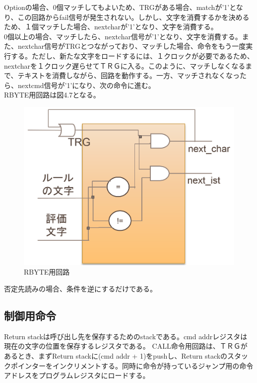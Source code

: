 \documentclass[12pt,oneside]{report}
\begin{document}
Optionの場合、0個マッチしてもよいため、TRGがある場合、matchが'1'となり、この回路からfail信号が発生されない。しかし、文字を消費するかを決めるため、１個マッチした場合、nextcharが'1'となり、文字を消費する。\\

0個以上の場合、マッチしたら、nextchar信号が'1'となり、文字を消費する。また、nextchar信号がTRGとつながっており、マッチした場合、命令をもう一度実行する。ただし、新たな文字をロードするには、１クロックが必要であるため、nextcharを１クロック遅らせてＴＲＧに入る。このように、マッチしなくなるまで、テキストを消費しながら、回路を動作する。一方、マッチされなくなったら、nextcmd信号が'1'になり、次の命令に進む。\\
RBYTE用回路は図4.7となる。

\begin{figure}[t]
    \begin{center}
        \includegraphics[width=130mm]{./fig/rbyte.png}
       \caption{RBYTE用回路}
        \label{fig:rbyte}
    \end{center}
\end{figure}

否定先読みの場合、条件を逆にするだけである。


\subsection{制御用命令}
Return stackは呼び出し先を保存するためのstackである。cmd addrレジスタは現在の文字の位置を保存するレジスタである。
CALL命令用回路は、ＴＲＧがあるとき、まずReturn stackに(cmd addr + 1)をpushし、Return stackのスタックポインターをインクリメントする。同時に命令が持っているジャンプ用の命令アドレスをプログラムレジスタにロードする。\\
\end{document}
